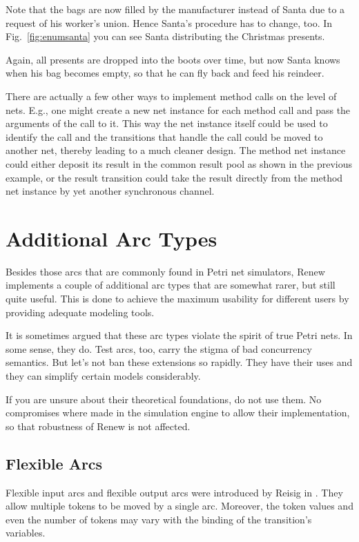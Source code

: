 Note that
the bags are now filled by the manufacturer instead of Santa
due to a request of his worker's union. Hence
Santa's procedure has to change, too. In Fig.~\ref{fig:enumsanta}
you can see Santa distributing the Christmas presents.


Again, all presents are dropped into the boots over time, but
now Santa knows when his bag becomes empty, so that he can
fly back and feed his reindeer.

There are actually a few other ways to implement method calls
on the level of nets. E.g., one might create a new net instance
for each method call and pass the arguments of the call to it.
This way the net instance itself could
be used to identify the call and the transitions that handle the call
could be moved to another net, thereby leading to a much cleaner
design. The method net instance could either deposit its
result in the common result pool as shown in the previous example,
or the result transition could take the result directly from
the method net instance by yet another synchronous channel.

\section{Additional Arc Types}
\label{sec:additionalArcs}

Besides those arcs that are commonly found in Petri net simulators,
Renew implements a couple of additional arc types that are
somewhat rarer, but still quite useful. This is done to achieve
the maximum usability for different users by providing
adequate modeling tools.

It is sometimes argued that these arc types violate the spirit
of true Petri nets. In some sense, they do. Test arcs, too,
carry the stigma of bad concurrency semantics. But let's not
ban these extensions so rapidly. They have their uses
and they can simplify certain models considerably.

If you are unsure about their theoretical foundations,
do not use them. No compromises where made in the simulation
engine to allow their implementation, so that robustness of Renew
is not affected.


\subsection{Flexible Arcs}\label{subsec:flexArcs}

Flexible
input arcs and flexible output arcs were
introduced by Reisig in \cite{reisig91}.
They allow multiple tokens to be moved by a single arc.
Moreover, the token values and even the number of tokens
may vary with the binding of the transition's variables.

